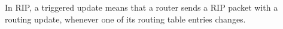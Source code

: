 In RIP, a triggered update means that a router sends a RIP packet with a routing update, whenever one of its routing table entries changes.

